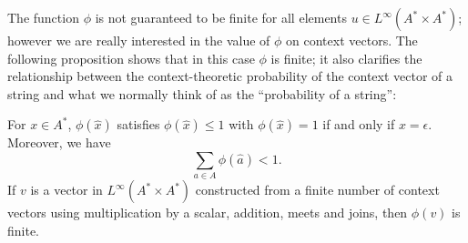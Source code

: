 The function $\phi$ is not guaranteed to be finite for all elements $u \in L^\infty(A^*\times A^*)$; however we are really interested in the value of $\phi$ on context vectors. The following proposition shows that in this case $\phi$ is finite; it also clarifies the relationship between the context-theoretic probability of the context vector of a string and what we normally think of as the ``probability of a string'':
\begin{prop}
For $x \in A^*$, $\phi(\hat{x})$ satisfies $\phi(\hat{x}) \le 1$ with $\phi(\hat{x}) = 1$ if and only if $x = \epsilon$. Moreover, we have
$$\sum_{a \in A} \phi(\hat{a}) < 1.$$
If $v$ is a vector in $L^\infty(A^*\times A^*)$ constructed from a finite number of context vectors using multiplication by a scalar, addition, meets and joins, then $\phi(v)$ is finite.
\end{prop}





